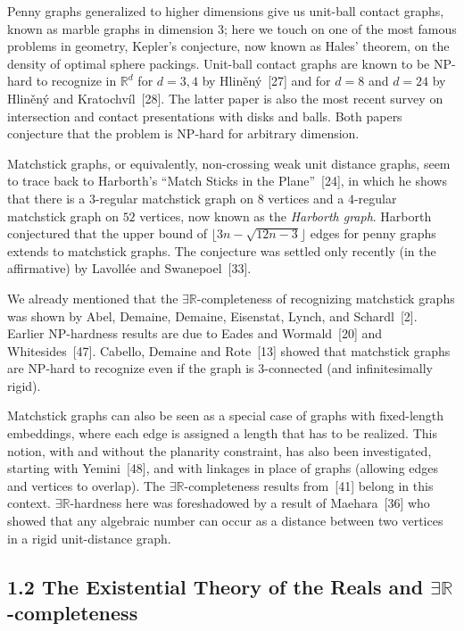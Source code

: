 \documentclass{article}
\begin{document}
Penny graphs generalized to higher dimensions give us unit-ball contact graphs, known as marble graphs in dimension $3$; here we touch on one of the most famous problems in geometry, Kepler's conjecture, now known as Hales' theorem, on the density of optimal sphere packings. Unit-ball contact graphs are known to be \textsf{NP}-hard to recognize in $\ensuremath{\mathbb{R}}^d$ for $d = 3, 4$ by Hliněný~[27] and for $d = 8$ and $d = 24$ by Hliněný and Kratochvíl~[28]. The latter paper is also the most recent survey on intersection and contact presentations with disks and balls. Both papers conjecture that the problem is \textsf{NP}-hard for arbitrary dimension. 

Matchstick graphs, or equivalently, non-crossing weak unit distance graphs, seem to trace back to Harborth's ``Match Sticks in the Plane''~[24], in which he shows that there is a $3$-regular matchstick graph on $8$ vertices and a $4$-regular matchstick graph on $52$ vertices, now known as the {\em Harborth graph}.  Harborth conjectured that the upper bound of  $\lfloor 3n-\sqrt{12n-3}\rfloor$ edges for penny graphs extends to matchstick graphs.
The conjecture was settled only recently (in the affirmative) by Lavollée and Swanepoel~[33].

We already mentioned that the \ensuremath{\exists\mathbb{R}}-completeness of 
recognizing matchstick graphs was shown by Abel, Demaine, Demaine, Eisenstat, Lynch, and Schardl~[2]. Earlier \textsf{NP}-hardness results are due to Eades and Wormald~[20] and Whitesides~[47]. Cabello, Demaine and Rote~[13] showed that matchstick graphs are \textsf{NP}-hard to recognize even if the graph is $3$-connected (and infinitesimally rigid).  

Matchstick graphs can also be seen as a special case of graphs with fixed-length embeddings, where each edge is assigned a length that has to be realized. This notion, with and without the planarity constraint, has also been investigated, starting with Yemini~[48], and with linkages in place of graphs (allowing edges and vertices to overlap). The \ensuremath{\exists\mathbb{R}}-completeness results from~[41] belong in this context. \ensuremath{\exists\mathbb{R}}-hardness here was foreshadowed by a result of 
Maehara~[36] who showed that any algebraic number can occur as a distance between two vertices in a rigid unit-distance graph. 

\subsection*{1.2 The Existential Theory of the Reals and \ensuremath{\exists\mathbb{R}}-completeness}
\end{document}
